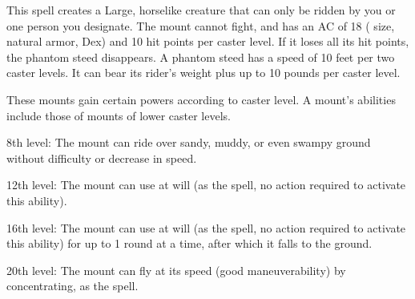 \spellrng{\rngclose}
\begin{spelleffect}
  This spell creates a Large, horselike creature that can only be ridden by you or one person you designate. The mount cannot fight, and has an AC of 18 ( size,  natural armor,  Dex) and 10 hit points  per caster level. If it loses all its hit points, the phantom steed disappears. A phantom steed has a speed of 10 feet per two caster levels. It can bear its rider's weight plus up to 10 pounds per caster level.
  \par These mounts gain certain powers according to caster level. A mount's abilities include those of mounts of lower caster levels. 
  \par 8th level: The mount can ride over sandy, muddy, or even swampy ground without difficulty or decrease in speed.

  \par 12th level: The mount can use  at will (as the spell, no action required to activate this ability).

  \par 16th level: The mount can use  at will (as the spell, no action required to activate this ability) for up to 1 round at a time, after which it falls to the ground.

  \par 20th level: The mount can fly at its speed (good maneuverability) by concentrating, as the  spell.
\end{spelleffect}

